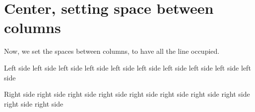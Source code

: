\documentclass{article}
\begin{document}
\section{Center, setting space between columns}

Now, we set the spaces between columns, to have all the line occupied.

\setlength{\beforecolumnseparator}{0.06\textwidth}
\setlength{\aftercolumnseparator}{0.06\textwidth}

\vspace{\baselineskip}

\begin{pairs}

\begin{Leftside}
\beginnumbering
\pstart
Left side left side left side left side left side left side left side left side left side left side
\pend
\endnumbering
\end{Leftside}

\begin{Rightside}
\beginnumbering
\pstart
Right side right side right side right side right side right side right side right side right side right side
\pend
\endnumbering
\end{Rightside}
\end{pairs}
\Columns
\end{document}
